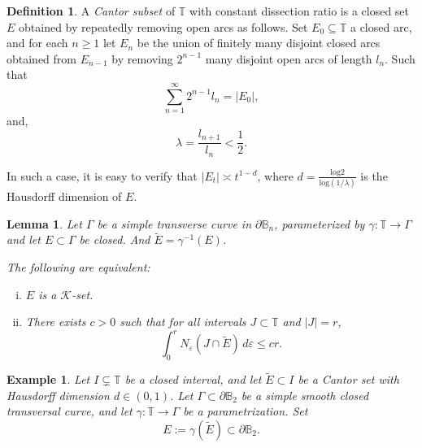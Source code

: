 \documentclass[a4paper,12pt]{amsart}
\newtheorem{lem}[thm]{Lemma}
\newtheorem{exam}[thm]{Example}
\theoremstyle{definition}
\newtheorem{defn}[thm]{Definition}
\theoremstyle{remark}
\def\Bn{\mathbb{B}_n}
\begin{document}
\begin{defn}
    A \emph{Cantor subset} of $\mathbb{T}$ with constant dissection ratio is a closed set
    $E$ obtained by repeatedly removing open arcs as follows.  
    Set $E_0 \subseteq \mathbb{T}$ a closed arc, and for each $n \ge 1$ let $E_n$ be the union of finitely many disjoint closed arcs
    obtained from $E_{n-1}$ by removing $2^{n-1}$ many disjoint open arcs of length $l_n$.  
    Such that
    \begin{equation*}
        \sum_{n=1}^{\infty} 2^{n-1} l_n = |E_0|,
    \end{equation*}
     and,
    \begin{equation*}
        \lambda = \frac{l_{n+1}}{l_n} < \frac{1}{2}.
    \end{equation*}
\end{defn}

In such a case, it is easy to verify that $|E_t| \asymp t^{1-d}$, where $d = \frac{\mathrm{log} 2}{\mathrm{log}(1/\lambda)}$ is the Hausdorff dimension of $E$.

\begin{lem}{\cite[Lemma~4.1]{Bruna1986}} \label{lem: K-set condition}
Let $\Gamma$ be a simple transverse curve in $\partial \Bn$, parameterized by $\gamma : \mathbb{T} \to \Gamma$ and let $E \subset \Gamma$ be closed. And $\tilde{E} = \gamma^{-1}(E)$.

The following are equivalent:
\begin{enumerate}[(i)]
    \item $E$ is a $\mathcal{K}$-set.
    \item There exists $c > 0$ such that for all intervals $J \subset \mathbb{T}$ and $|J| = r$,
    \begin{equation} \label{eq:K-set Circle}    
        \int_0^r N_\varepsilon(J \cap \tilde{E})\, d\varepsilon \leq c r.
    \end{equation}
\end{enumerate}
\end{lem}

\begin{exam}
Let $I \subsetneq \mathbb T$ be a closed interval, and let $\tilde E \subset I$
be a Cantor set with Hausdorff dimension $d\in(0,1)$.
Let $\Gamma \subset \partial\mathbb B_2$ be a simple smooth closed transversal curve,
and let $\gamma:\mathbb T\to\Gamma$ be a parametrization.
Set
\begin{equation*}
    E := \gamma(\tilde E)\subset\partial\mathbb B_2 .
\end{equation*}
\end{exam}
\end{document}
